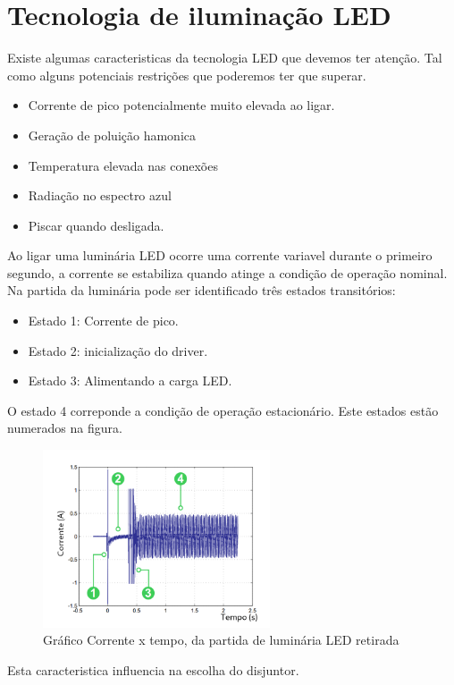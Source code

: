  
\section{Tecnologia de iluminação LED}
Existe algumas caracteristicas da tecnologia LED que devemos ter atenção. Tal como alguns potenciais restrições que poderemos ter que superar.
\begin{itemize}
\item Corrente de pico potencialmente muito elevada ao ligar.
\item Geração de poluição hamonica
\item Temperatura elevada nas conexões
\item Radiação no espectro azul
\item Piscar quando desligada.
\end{itemize}

Ao ligar uma luminária LED ocorre uma corrente variavel durante o primeiro segundo, a corrente se estabiliza quando atinge a condição de operação nominal. Na partida da luminária pode ser identificado três estados transitórios:
\begin{itemize}
  \item Estado 1: Corrente de pico.
  \item Estado 2: inicialização do driver.
  \item Estado 3: Alimentando a carga LED.
  \end{itemize}  
O estado 4 correponde a condição de operação estacionário. Este estados estão numerados na figura.
\begin{figure}[h]
    \centering
    \includegraphics[width=0.6\textwidth]{image/correntextempo.png}
    \caption{Gráfico Corrente x tempo, da partida de luminária LED retirada}
   \label{fig:bornes}
\end{figure}
Esta caracteristica influencia na escolha do disjuntor. 

